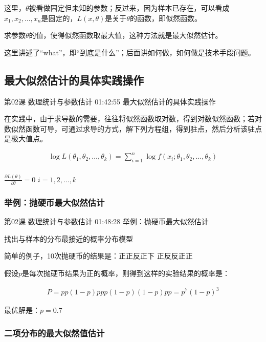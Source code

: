 \documentclass[UTF8]{ctexart}
\begin{document}
这里，$\theta$被看做固定但未知的参数；反过来，因为样本已存在，可以看成$x_{1},x_{2},\dots,x_{n}$是固定的，$L(x,\theta)$是关于$\theta$的函数，即似然函数。

求参数$\theta$的值，使得似然函数取最大值，这种方法就是最大似然估计。

这里讲述了“what”，即“到底是什么”；后面讲如何做，如何做是技术手段问题。

\subsection{最大似然估计的具体实践操作}

第02课 数理统计与参数估计 01:42:55 最大似然估计的具体实践操作

在实践中，由于求导数的需要，往往将似然函数取对数，得到对数似然函数；若对数似然函数可导，可通过求导的方式，解下列方程组，得到驻点，然后分析该驻点是极大值点。

\begin{equation}
\begin{aligned}
\log L(\theta_{1},\theta_{2},\dots,\theta_{k})
=\sum_{i=1}^{n} \log f(x_{i};\theta_{1},\theta_{2},\dots,\theta_{k}) \\
\end{aligned}
\end{equation}


$\frac{\partial L(\theta)}{\partial \theta}=0$ \quad $i=1,2,\dots,k$

\subsubsection{举例：抛硬币最大似然估计}

第02课 数理统计与参数估计 01:48:28 举例：抛硬币最大似然估计

找出与样本的分布最接近的概率分布模型

简单的例子，10次抛硬币的结果是：正正反正下 正反反正正

假设$p$是每次抛硬币结果为正的概率，则得到这样的实验结果的概率是：

\begin{equation}
\begin{aligned}
P=pp(1-p)ppp(1-p)(1-p)pp=p^{7}(1-p)^{3}
\end{aligned}
\end{equation}

最优解是：$p=0.7$

\subsubsection{二项分布的最大似然值估计}
\end{document}
